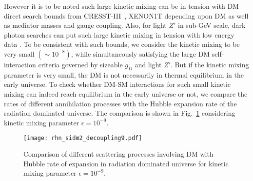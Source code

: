 \documentclass[prd,nofootinbib,preprint,superscriptaddress]{revtex4}
\begin{document}
		However it is to be noted such large kinetic mixing can be in tension with DM direct search bounds from  CRESST-III~\cite{Abdelhameed:2019hmk}, XENON1T \cite{Aprile:2018dbl} depending upon DM as well as mediator masses and gauge coupling. Also, for light $Z'$ in sub-GeV scale, dark photon searches can put such large kinetic mixing in tension with low energy data \cite{Bauer:2018onh}. To be consistent with such bounds, we consider the kinetic mixing to be very small $(\sim 10^{-8})$, while simultaneously satisfying the large DM self-interaction criteria governed by sizeable $g_D$ and light $Z'$. But if the kinetic mixing parameter is very small, the DM is not necessarily in thermal equilibrium in the early universe. To check whether DM-SM interactions for such small kinetic mixing can indeed reach equilibrium in the early universe or not, we compare the rates of different annihilation processes with the Hubble expansion rate of the radiation dominated universe. The comparison is shown in Fig.~\ref{Decoupling8} considering kinetic mixing parameter $\epsilon = 10^{-9}$.
		
		\begin{figure}
			\centering
			\texttt{[image: rhn\_sidm2\_decoupling9.pdf]}
			\caption{Comparison of different scattering processes involving DM with Hubble rate of expansion in radiation dominated universe for kinetic mixing parameter $\epsilon = 10^{-9}$.}
			\label{Decoupling8}
		\end{figure}
		
\end{document}
